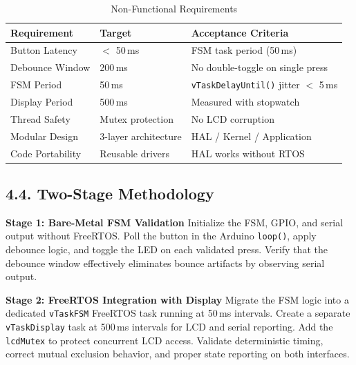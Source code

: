 \documentclass[12pt]{article}
\begin{document}
\begin{table}[H]
    \centering
    \caption{Non-Functional Requirements}
    \label{tab:non-functional-requirements}
    \begin{tabular}{|l|l|l|}
        \hline
        \textbf{Requirement} & \textbf{Target} & \textbf{Acceptance Criteria} \\
        \hline
        Button Latency & $<$ 50\,ms & FSM task period (50\,ms) \\
        \hline
        Debounce Window & 200\,ms & No double-toggle on single press \\
        \hline
        FSM Period & 50\,ms & \texttt{vTaskDelayUntil()} jitter $<$ 5\,ms \\
        \hline
        Display Period & 500\,ms & Measured with stopwatch \\
        \hline
        Thread Safety & Mutex protection & No LCD corruption \\
        \hline
        Modular Design & 3-layer architecture & HAL / Kernel / Application \\
        \hline
        Code Portability & Reusable drivers & HAL works without RTOS \\
        \hline
    \end{tabular}
\end{table}

\subsection*{4.4. Two-Stage Methodology}

\textbf{Stage 1: Bare-Metal FSM Validation}
\newline
Initialize the FSM, GPIO, and serial output without FreeRTOS. Poll the button in the Arduino \texttt{loop()}, apply debounce logic, and toggle the LED on each validated press. Verify that the debounce window effectively eliminates bounce artifacts by observing serial output.

\textbf{Stage 2: FreeRTOS Integration with Display}
\newline
Migrate the FSM logic into a dedicated \texttt{vTaskFSM} FreeRTOS task running at 50\,ms intervals. Create a separate \texttt{vTaskDisplay} task at 500\,ms intervals for LCD and serial reporting. Add the \texttt{lcdMutex} to protect concurrent LCD access. Validate deterministic timing, correct mutual exclusion behavior, and proper state reporting on both interfaces.

\end{document}
